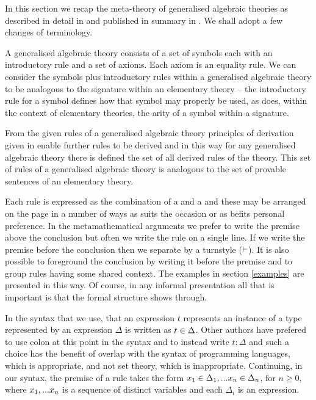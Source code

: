 \label{generalisedalgrbraictheories}

In this section we recap the meta-theory of generalised algebraic theories 
as described in detail in \cite{Cartmell78}  and published in summary in \cite{Cartmell86}.
We shall adopt a few changes of terminology.

A generalised algebraic theory consists of a set of symbols each with an introductory rule and a set of axioms. 
Each axiom is an equality rule. We can consider the symbols plus introductory rules within a generalised algebraic theory to be analogous to the signature within an elementary theory --
the introductory rule for a symbol defines how that symbol may properly be used, as does, within the context of elementary theories, the arity of a symbol within a signature.

From the given rules of a generalised algebraic theory  principles of derivation given in \cite{Cartmell86} enable further rules
to be derived and in this way for any generalised algebraic theory there is defined the set of all derived rules of the theory. 
This set of rules of a generalised algebraic theory is analogous to the set of provable sentences of an elementary theory.
  
Each rule is expressed as the combination of a   and a  
and these may be arranged on the page in a number of ways as suits the occasion or as befits personal preference. 
In the metamathematical arguments we prefer to write the premise above the conclusion 
 but often we write the rule on a single line. 
If we write the premise before the conclusion then we separate by a turnstyle ($\vdash$). 
It is also possible to foreground the conclusion by writing it before the premise and to group rules having some shared context. The 
examples in section \ref{examples} are presented in this way.
Of course, in any informal presentation all that is important is that the formal structure shows through.  

In the syntax that we use,  that an expression $t$ represents an instance of a type represented by an expression $\Delta$ is written as $t \in \Delta$. Other authors have prefered to use colon at this point in the syntax  and to instead write $t:\Delta$ and such a choice has the benefit of overlap with the syntax
of programming languages, which is appropriate, and not set theory, which is inappropriate. Continuing, in our syntax,
the premise of a rule  takes the form $x_1 \in \Delta_1,... x_{n} \in \Delta_{n}$, for $n \geq 0$, where $x_1,...x_n$ is a sequence of distinct variables and each $\Delta_i$ is an expression.


